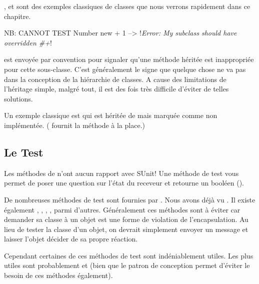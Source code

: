 \documentclass[a4paper,10pt,twoside]{book}
\begin{document}
,  et  sont des exemples classiques de  classes  que nous verrons rapidement dans ce chapitre.

\begin{code}{NB: CANNOT TEST}
Number new + 1 --> !\emph{Error: My subclass should have overridden \#+}!
\end{code}

 est envoy\'ee par convention pour signaler qu'une m\'ethode h\'erit\'ee est inappropri\'ee pour cette sous-classe. C'est g\'en\'eralement le signe que quelque chose ne va pas dans la conception de la hi\'erarchie de classes. A cause des limitations de l'h\'eritage simple, malgr\'e tout, il est des fois tr\`es difficile d'\'eviter de telles solutions.

Un exemple classique est  qui est h\'erit\'ee de  mais marqu\'ee comme non impl\'ement\'ee. ( fournit la m\'ethode  \`a la place.)



\subsection{Le Test}

Les m\'ethodes de  n'ont aucun rapport avec SUnit! Une m\'ethode de test vous permet de poser une question sur l'\'etat du receveur et retourne un bool\'een ().

De nombreuses m\'ethodes de test sont fournies par . Nous avons d\'ej\`a vu . Il existe \'egalement , , , , parmi d'autres. G\'en\'eralement ces m\'ethodes sont \`a \'eviter car demander sa classe \`a un objet est une forme de violation de l'encapsulation. Au lieu de tester la classe d'un objet, on devrait simplement envoyer un message et laisser l'objet d\'ecider de sa propre r\'eaction.

Cependant certaines de ces m\'ethodes de test sont ind\'eniablement utiles. Les plus utiles sont probablement  et  (bien que le patron de conception \cite{Wool98a} permet d'\'eviter le besoin de ces m\'ethodes \'egalement).
\end{document}
